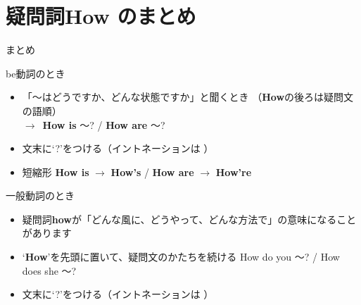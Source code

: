 \documentclass[aspectratio=169,xcolor={dvipsnames,table}]{beamer}
\begin{document}
\section{疑問詞How  のまとめ}
\begin{frame}[plain]{まとめ}
 \begin{block}{be動詞のとき}\small
\begin{itemize}[square]\small
 \item 「〜はどうですか、どんな状態ですか」と聞くとき
（{\bfseries How}の後ろは疑問文の語順）\\
$\longrightarrow$\,\,\,{\bfseries How is} 〜? / {\bfseries How are} 〜?
 \item   文末に`?'をつける（イントネーションは\myDownwardPitch{}\,\,）
 \item 短縮形 {\bfseries How is} $\longrightarrow$ {\bfseries How's} / {\bfseries How are} $\longrightarrow$ {\bfseries How're}
\end{itemize}
     \end{block}

\begin{block}{一般動詞のとき}\small
\begin{itemize}[square]\small
 \item 疑問詞{\bfseries how}が「どんな風に、どうやって、どんな方法で」の意味になることがあります
 \item `{\bfseries How}'を先頭に置いて、疑問文のかたちを続ける\,\,How do you  〜? / How does she 〜? 
 \item   文末に`?'をつける（イントネーションは\myDownwardPitch{}\,\,）
\end{itemize}
     \end{block}
\end{frame}
\end{document}
